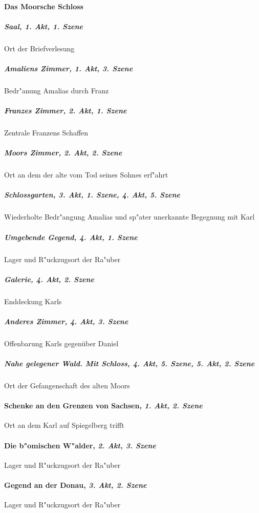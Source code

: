 \paragraph{Das Moorsche Schloss}
	\subparagraph{Saal, \textit{1. Akt, 1. Szene}}
		Ort der Briefverlesung
	\subparagraph{Amaliens Zimmer, \textit{1. Akt, 3. Szene}}
		Bedr"anung Amalias durch Franz
	\subparagraph{Franzes Zimmer, \textit{2. Akt, 1. Szene}}
		Zentrale Franzens Schaffen
	\subparagraph{Moors Zimmer, \textit{2. Akt, 2. Szene}}
		Ort an dem der alte vom Tod seines Sohnes erf"ahrt
	\subparagraph{Schlossgarten, \textit{3. Akt, 1. Szene}, \textit{4. Akt, 5. Szene}}
		Wiederholte Bedr"angung Amalias und sp"ater unerkannte Begegnung mit Karl
	\subparagraph{Umgebende Gegend, \textit{4. Akt, 1. Szene}}
		Lager und R"uckzugsort der Ra"uber
	\subparagraph{Galerie, \textit{4. Akt, 2. Szene}}
		Enddeckung Karls
	\subparagraph{Anderes Zimmer, \textit{4. Akt, 3. Szene}}
		Offenbarung Karls gegenüber Daniel
	\subparagraph{Nahe gelegener Wald. Mit Schloss, \textit{4. Akt, 5. Szene}, \textit{5. Akt, 2. Szene}}
		Ort der Gefangenschaft des alten Moors
\paragraph{Schenke an den Grenzen von Sachsen, \textit{1. Akt, 2. Szene}}
Ort an dem Karl auf Spiegelberg trifft
\paragraph{Die b"omischen W"alder, \textit{2. Akt, 3. Szene}}
Lager und R"uckzugsort der Ra"uber
\paragraph{Gegend an der Donau, \textit{3. Akt, 2. Szene}}
Lager und R"uckzugsort der Ra"uber
